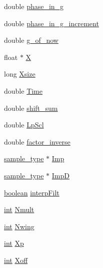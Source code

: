 \begin{DoxyCompactItemize}
\item 
double \hyperlink{structresamplev__susp__struct_ac58338da86c7d858620ddc0eda4a48fb}{phase\+\_\+in\+\_\+g}
\item 
double \hyperlink{structresamplev__susp__struct_a8dcb861996f8858da4bc1193f57959dc}{phase\+\_\+in\+\_\+g\+\_\+increment}
\item 
double \hyperlink{structresamplev__susp__struct_a647d3c5bb2b1d81b40dd5935e523f5c4}{g\+\_\+of\+\_\+now}
\item 
float $\ast$ \hyperlink{structresamplev__susp__struct_a26dc0976b9e2c6bad54ef4874b2acf55}{X}
\item 
long \hyperlink{structresamplev__susp__struct_a199dc3d3e621bf2bf9abc9e3d50f49e6}{Xsize}
\item 
double \hyperlink{structresamplev__susp__struct_a6df75594d65cde48238fc64f0482a12b}{Time}
\item 
double \hyperlink{structresamplev__susp__struct_a6d178f465a427471d3e4f8ef3a31eac7}{shift\+\_\+sum}
\item 
double \hyperlink{structresamplev__susp__struct_a857ef80887cec53fe13035faae37cdab}{Lp\+Scl}
\item 
double \hyperlink{structresamplev__susp__struct_aef32f4ef95a51e6d9d1d8118392f0ed9}{factor\+\_\+inverse}
\item 
\hyperlink{sound_8h_a3a9d1d4a1c153390d2401a6e9f71b32c}{sample\+\_\+type} $\ast$ \hyperlink{structresamplev__susp__struct_acd762383745dccb4768ccc071e4ce111}{Imp}
\item 
\hyperlink{sound_8h_a3a9d1d4a1c153390d2401a6e9f71b32c}{sample\+\_\+type} $\ast$ \hyperlink{structresamplev__susp__struct_a573b2e8010885b1dcb52e8a7472f11eb}{ImpD}
\item 
\hyperlink{cext_8h_a7670a4e8a07d9ebb00411948b0bbf86d}{boolean} \hyperlink{structresamplev__susp__struct_a841f3a7b47d2e3c5653fee314e9203f1}{interp\+Filt}
\item 
\hyperlink{xmltok_8h_a5a0d4a5641ce434f1d23533f2b2e6653}{int} \hyperlink{structresamplev__susp__struct_ac9838c8c74ced6f149e926cdb75ffb04}{Nmult}
\item 
\hyperlink{xmltok_8h_a5a0d4a5641ce434f1d23533f2b2e6653}{int} \hyperlink{structresamplev__susp__struct_a81a1e26c05be0c80e452b835785bce73}{Nwing}
\item 
\hyperlink{xmltok_8h_a5a0d4a5641ce434f1d23533f2b2e6653}{int} \hyperlink{structresamplev__susp__struct_a01fb5edc5c9e7499286968ab0f828046}{Xp}
\item 
\hyperlink{xmltok_8h_a5a0d4a5641ce434f1d23533f2b2e6653}{int} \hyperlink{structresamplev__susp__struct_ae8344f156386fd446dde94b31c0b7ee2}{Xoff}
\end{DoxyCompactItemize}


